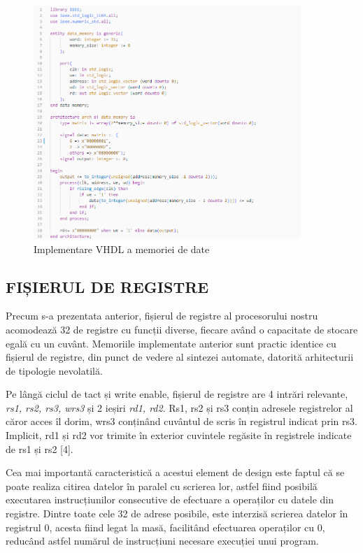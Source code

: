 \documentclass[12pt]{article}
\begin{document}
 \begin{figure}[h!]
 \includegraphics[width=0.9\textwidth]{datamemcode.png}
 \centering
 \caption{Implementare VHDL a memoriei de date}
 \label{Figura:33}
 \end{figure}

 \subsection{FIȘIERUL DE REGISTRE}
 
 Precum s-a prezentata anterior, fișierul de registre al procesorului nostru acomodează 32 de registre cu funcții diverse, fiecare având o capacitate de stocare egală cu un cuvânt. Memoriile implementate anterior sunt practic identice cu fișierul de registre, din punct de vedere al sintezei automate,  datorită arhitecturii de tipologie nevolatilă.
 
 Pe lângă ciclul de tact și write enable, fișierul de registre are 4 intrări relevante,  \textit{rs1, rs2, rs3, wrs3} și 2 ieșiri \textit{rd1, rd2}. Rs1, rs2 și rs3 conțin adresele registrelor al căror acces îl dorim, wrs3 conținând cuvântul de scris în registrul indicat prin rs3. Implicit, rd1 și rd2 vor trimite în exterior cuvintele regăsite în registrele indicate de rs1 și rs2 [4].
 
  Cea mai importantă caracteristică a acestui element de design este faptul că se poate realiza citirea datelor în paralel cu scrierea lor, astfel fiind posibilă executarea instrucțiunilor consecutive de efectuare a operaților cu datele din registre. Dintre toate cele 32 de adrese posibile, este interzisă scrierea datelor în registrul 0, acesta fiind legat la masă, facilitând efectuarea operaților cu 0, reducând astfel numărul de instrucțiuni necesare execuției unui program.
  
\end{document}
